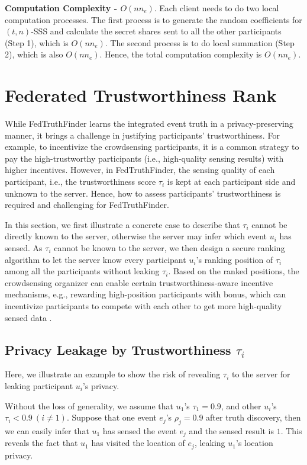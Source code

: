 \documentclass[11pt]{article}
\begin{document}
\textbf{Computation Complexity - $O(nn_e)$}. Each client needs to do two local computation processes. The first process is to generate the random coefficients for $(t,n)$-SSS and calculate the secret shares sent to all the other participants (Step 1), which is $O(nn_e)$. The second process is to do local summation (Step 2), which is also $O(nn_e)$. Hence, the total computation complexity is $O(nn_e)$.


\section{Federated Trustworthiness Rank}
\label{sec:trust_ranking}

While FedTruthFinder learns the integrated event truth in a privacy-preserving manner, it brings a challenge in justifying participants' trustworthiness. For example, to incentivize the crowdsensing participants, it is a common strategy to pay the high-trustworthy participants (i.e., high-quality sensing results) with higher incentives. However, in FedTruthFinder, the sensing quality of each participant, i.e., the trustworthiness score $\tau_i$ is kept at each participant side and unknown to the server. Hence, how to assess participants' trustworthiness is required and challenging for FedTruthFinder.

In this section, we first illustrate a concrete case to describe that $\tau_i$ cannot be directly known to the server, otherwise the server may infer which event $u_i$ has sensed. As $\tau_i$ cannot be known to the server, we then design a secure ranking algorithm to let the server know every participant $u_i$'s ranking position of $\tau_i$ among all the participants without leaking $\tau_i$. Based on the ranked positions, the crowdsensing organizer can enable certain trustworthiness-aware incentive mechanisms, e.g., rewarding high-position participants with bonus, which can incentivize participants to compete with each other to get more high-quality sensed data \cite{Leye-Reddy2010ExaminingMF}.

\subsection{Privacy Leakage by Trustworthiness $\tau_i$}

Here, we illustrate an example to show the risk of revealing $\tau_i$ to the server for leaking participant $u_i$'s privacy.

Without the loss of generality, we assume that $u_1$'s $\tau_1 = 0.9$, and other $u_i$'s $\tau_i < 0.9\ (i\not=1)$. Suppose that one event $e_j$'s $\rho_j = 0.9$ after truth discovery, then we can easily infer that $u_1$ has sensed the event $e_j$ and the sensed result is $1$. This reveals the fact that $u_1$ has visited the location of $e_j$, leaking $u_1$'s location privacy.
\end{document}
